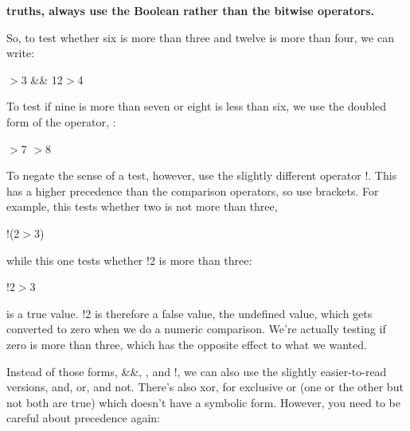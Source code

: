 \documentclass[a4paper,11pt]{book}
\begin{document}
\noindent \textbf{truths, always use the Boolean rather than the bitwise operators.}

\noindent 

\noindent 

\noindent So, to test whether six is more than three and twelve is more than four, we can write:

\noindent 

\noindent 

$>$3 \&\& 12$>$4 

\noindent 

\noindent To test if nine is more than seven or eight is less than six, we use the doubled form of the \textbar  operator, \textbar \textbar :

\noindent 

\noindent 

$>$7 \textbar {}$>$8 

\noindent 

\noindent To  negate  the  sense of a test,  however,  use  the  slightly  different  operator  !.  This has  a  higher precedence than the comparison operators, so use brackets. For example, this tests whether two is not more than three,

\noindent 

\noindent 

\noindent !(2$>$3)

\noindent 

\noindent while this one tests whether !2 is more than three:

\noindent 

\noindent 

\noindent !2$>$3

\noindent 

 is a true value. !2 is therefore a false value, the undefined value, which gets converted to zero when we do a numeric comparison. We're actually testing if zero is more than three, which has the opposite effect to what we wanted.

\noindent 

\noindent Instead of those forms, \&\&, \textbar \textbar , and !, we can also use the slightly easier-to-read versions, and, or, and not. There's also xor, for exclusive or (one or the other but not both are true) which doesn't have a symbolic form. However, you need to be careful about precedence again:

\noindent 

\noindent 
\end{document}
